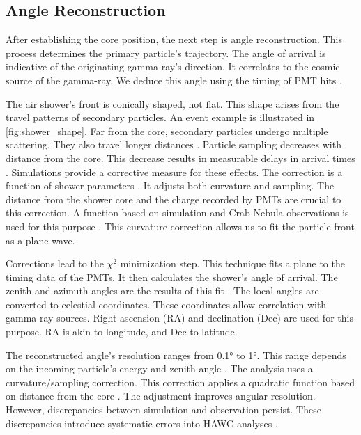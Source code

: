 \subsection{Angle Reconstruction} \label{sec:hawc_angleReco}

After establishing the core position, the next step is angle reconstruction.
This process determines the primary particle's trajectory.
The angle of arrival is indicative of the originating gamma ray's direction.
It correlates to the cosmic source of the gamma-ray.
We deduce this angle using the timing of PMT hits \cite{Abeysekara_2017}.

The air shower's front is conically shaped, not flat.
This shape arises from the travel patterns of secondary particles.
An event example is illustrated in \cref{fig:shower_shape}.
Far from the core, secondary particles undergo multiple scattering.
They also travel longer distances \cite{wcd_Sensitivity}.
Particle sampling decreases with distance from the core.
This decrease results in measurable delays in arrival times \cite{wcd_Sensitivity,Abeysekara_2017}.
Simulations provide a corrective measure for these effects.
The correction is a function of shower parameters \cite{Abeysekara_2017}.
It adjusts both curvature and sampling.
The distance from the shower core and the charge recorded by PMTs are crucial to this correction.
A function based on simulation and Crab Nebula observations is used for this purpose \cite{Abeysekara_2017}.
This curvature correction allows us to fit the particle front as a plane wave.

Corrections lead to the $\chi^2$ minimization step.
This technique fits a plane to the timing data of the PMTs.
It then calculates the shower's angle of arrival.
The zenith and azimuth angles are the results of this fit \cite{wcd_Sensitivity}.
The local angles are converted to celestial coordinates.
These coordinates allow correlation with gamma-ray sources.
Right ascension (RA) and declination (Dec) are used for this purpose.
RA is akin to longitude, and Dec to latitude.

The reconstructed angle's resolution ranges from 0.1° to 1°.
This range depends on the incoming particle's energy and zenith angle \cite{wcd_Sensitivity}.
The analysis uses a curvature/sampling correction.
This correction applies a quadratic function based on distance from the core \cite{Abeysekara_2017}.
The adjustment improves angular resolution.
However, discrepancies between simulation and observation persist.
These discrepancies introduce systematic errors into HAWC analyses \cite{Abeysekara_2017}.

